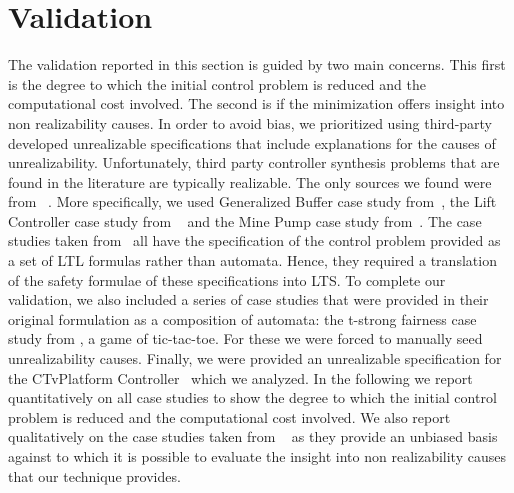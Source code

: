  
\section{Validation}

The validation reported in this section is guided by two main concerns.  This first is the degree to which the initial control problem is reduced and the computational cost involved. The second is if the minimization offers insight into non realizability causes.
In order to avoid bias, we prioritized using third-party developed unrealizable specifications that include explanations for the causes of unrealizability.
Unfortunately, third party controller synthesis problems that are found in the literature are typically realizable. The only sources we found were from ~\cite{DBLP:conf/hvc/KonighoferHB10,DBLP:conf/kbse/DegiovanniRACA16,DBLP:conf/fmcad/AlurMT13}. More specifically, we used Generalized Buffer case study from~\cite{DBLP:conf/hvc/KonighoferHB10}, the Lift Controller case study from ~\cite{DBLP:conf/fmcad/AlurMT13} and the Mine Pump case study from~\cite{DBLP:conf/kbse/DegiovanniRACA16}.
The case studies taken from~\cite{DBLP:conf/hvc/KonighoferHB10,DBLP:conf/kbse/DegiovanniRACA16,DBLP:conf/fmcad/AlurMT13} all have  the specification of the control problem  provided as a set of LTL formulas rather than automata. Hence, they required a translation of the safety formulae of these specifications into LTS. To complete our validation, we also included a series of case studies that were provided in their original formulation as a composition of automata: the t-strong fairness case study from \cite{DBLP:conf/icse/DIppolitoBPU11}, a game of tic-tac-toe. For these we were forced to manually seed unrealizability causes. Finally, we were provided an unrealizable specification for the CTvPlatform Controller~\cite{DBLP:journals/computer/OmmeringLKM00} which we analyzed. 
In the following we report quantitatively on all case studies to show the degree to which the initial control problem is reduced and the computational cost involved. We also report qualitatively on the case studies taken from ~\cite{DBLP:conf/hvc/KonighoferHB10,DBLP:conf/kbse/DegiovanniRACA16,DBLP:conf/fmcad/AlurMT13} as they provide an unbiased basis against to which it is possible to evaluate the insight into non realizability causes that our technique provides. 


